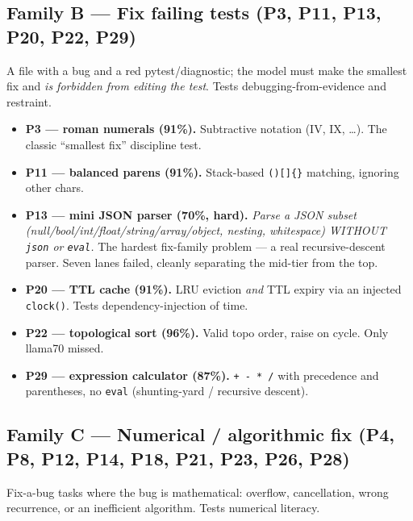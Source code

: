 \documentclass[11pt]{article}
\begin{document}
\subsection{Family B --- Fix failing tests (P3, P11, P13, P20, P22, P29)}
A file with a bug and a red pytest/diagnostic; the model must make the smallest fix
and \emph{is forbidden from editing the test}. Tests debugging-from-evidence and
restraint.

\begin{itemize}
\item \textbf{P3 --- roman numerals (91\%).} Subtractive notation (IV, IX, \ldots).
  The classic ``smallest fix'' discipline test.
\item \textbf{P11 --- balanced parens (91\%).} Stack-based \texttt{()[]\{\}}
  matching, ignoring other chars.
\item \textbf{P13 --- mini JSON parser (70\%, hard).} \emph{Parse a JSON subset
  (null/bool/int/float/string/array/object, nesting, whitespace) WITHOUT
  \texttt{json} or \texttt{eval}.} The hardest fix-family problem --- a real
  recursive-descent parser. Seven lanes failed, cleanly separating the mid-tier from
  the top.
\item \textbf{P20 --- TTL cache (91\%).} LRU eviction \emph{and} TTL expiry via an
  injected \texttt{clock()}. Tests dependency-injection of time.
\item \textbf{P22 --- topological sort (96\%).} Valid topo order, raise on cycle.
  Only llama70 missed.
\item \textbf{P29 --- expression calculator (87\%).} \texttt{+\,-\,*\,/} with
  precedence and parentheses, no \texttt{eval} (shunting-yard / recursive descent).
\end{itemize}

\subsection{Family C --- Numerical / algorithmic fix (P4, P8, P12, P14, P18, P21, P23, P26, P28)}
Fix-a-bug tasks where the bug is mathematical: overflow, cancellation, wrong
recurrence, or an inefficient algorithm. Tests numerical literacy.
\end{document}
